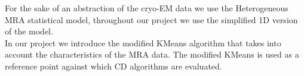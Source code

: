 For the sake of an abstraction of the \acrshort{cryo-EM} data we use the Heterogeneous \acrfull{MRA} statistical model, throughout our project we use the simplified 1D version of the model.\\
In our project we introduce the modified KMeans algorithm that takes into account the characteristics of the \acrshort{MRA} data. The modified KMeans is used as a reference point against which \acrfull{CD} algorithms are evaluated. 